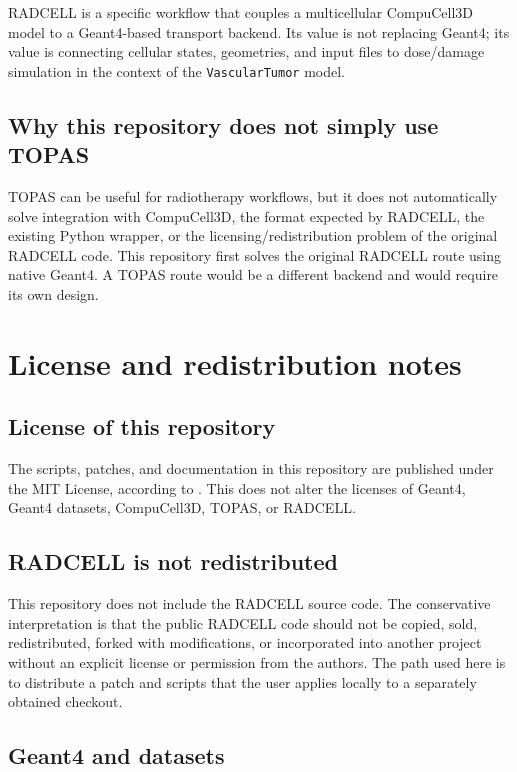 \documentclass[11pt,a4paper,twoside,pdftex]{refrep}
\begin{document}
RADCELL is a specific workflow that couples a multicellular CompuCell3D model to a Geant4-based transport backend. Its value is not replacing Geant4; its value is connecting cellular states, geometries, and input files to dose/damage simulation in the context of the \texttt{VascularTumor} model.

\section{Why this repository does not simply use TOPAS}

TOPAS can be useful for radiotherapy workflows, but it does not automatically solve integration with CompuCell3D, the format expected by RADCELL, the existing Python wrapper, or the licensing/redistribution problem of the original RADCELL code. This repository first solves the original RADCELL route using native Geant4. A TOPAS route would be a different backend and would require its own design.

\chapter{License and redistribution notes}

\section{License of this repository}

The scripts, patches, and documentation in this repository are published under the MIT License, according to . This does not alter the licenses of Geant4, Geant4 datasets, CompuCell3D, TOPAS, or RADCELL.

\section{RADCELL is not redistributed}

This repository does not include the RADCELL source code. The conservative interpretation is that the public RADCELL code should not be copied, sold, redistributed, forked with modifications, or incorporated into another project without an explicit license or permission from the authors. The path used here is to distribute a patch and scripts that the user applies locally to a separately obtained checkout.

\section{Geant4 and datasets}
\end{document}
